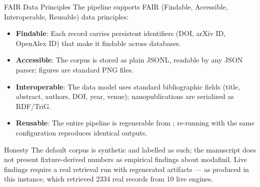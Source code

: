 \documentclass[
  ignorenonframetext,
]{beamer}
\providecommand{\tightlist}{%
  \setlength{\itemsep}{0pt}\setlength{\parskip}{0pt}}
\begin{document}
\begin{frame}{FAIR Data Principles}
\protect{}\label{fair-data-principles}
The pipeline supports FAIR (Findable, Accessible, Interoperable,
Reusable) data principles:

\begin{itemize}
\tightlist
\item
  \textbf{Findable}: Each record carries persistent identifiers (DOI,
  arXiv ID, OpenAlex ID) that make it findable across databases.
\item
  \textbf{Accessible}: The corpus is stored as plain JSONL, readable by
  any JSON parser; figures are standard PNG files.
\item
  \textbf{Interoperable}: The data model uses standard bibliographic
  fields (title, abstract, authors, DOI, year, venue); nanopublications
  are serialized as RDF/TriG.
\item
  \textbf{Reusable}: The entire pipeline is regenerable from
  ; re-running with the same
  configuration reproduces identical outputs.
\end{itemize}
\end{frame}

\begin{frame}[allowframebreaks]{Honesty}
\protect{}\label{honesty}
The default corpus is synthetic and labelled as such; the manuscript
does not present fixture-derived numbers as empirical findings about
modafinil. Live findings require a real retrieval run with regenerated
artifacts --- as produced in this instance, which retrieved 2334 real
records from 10 live engines.
\end{frame}
\end{document}
